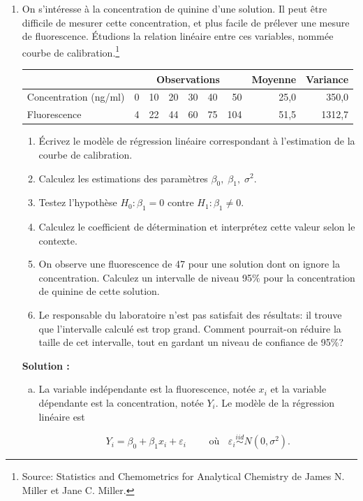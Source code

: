 \documentclass[letter, 11pt]{article}
\newcommand{\prof}[1]{\begin{professeur}\color{blue} {\bf Solution :} #1 \end{professeur}}
\begin{document}
\begin{enumerate}[leftmargin=*, wide, label=\bf Exercice \arabic*:]
\item On s\rq{}intéresse à la concentration de quinine d\rq{}une solution. Il peut être difficile de mesurer cette concentration, et plus facile de prélever une mesure de fluorescence. Étudions la relation linéaire entre ces variables, nommée courbe de calibration.\footnote{Source: Statistics and Chemometrics for Analytical Chemistry  de James N. Miller et Jane C. Miller.}

\begin{table}[h!]
\centering
\begin{tabular}{l|rrrrrr|r|r}
&\multicolumn{6}{|c|}{Observations}&Moyenne&Variance\\\hline
Concentration (ng/ml) & 0 & 10 & 20 & 30 & 40 & 50&25,0&350,0\\\hline
Fluorescence  & 4 & 22 & 44 & 60 & 75 & 104&51,5&1312,7
\end{tabular}
\end{table}

\begin{enumerate}
\item  Écrivez le modèle de régression linéaire correspondant à l\rq{}estimation de la courbe de calibration.
\item  Calculez les estimations des paramètres $\beta_0,\; \beta_1, \; \sigma^2$.
\item  Testez l\rq{}hypothèse $H_0 : \beta_1 =  0$ contre $H_1 : \beta_1 \ne 0$.
\item   Calculez le coefficient de détermination et interprétez cette valeur selon le contexte.
\item   On observe une fluorescence de 47 pour une solution dont on ignore la concentration. Calculez un intervalle de niveau 95$\%$ pour la concentration de quinine de cette solution.
\item   Le responsable du laboratoire n\rq{}est pas satisfait des résultats: il trouve que l\rq{}intervalle calculé est trop grand. Comment pourrait-on réduire la taille de cet intervalle, tout en gardant un niveau de confiance de 95\%?\\
\end{enumerate}

\prof{ \begin{enumerate}[a) ]\itemsep3mm
\item  La variable indépendante est la fluorescence, notée $x_i$ et la variable dépendante est la concentration, notée $Y_i$. Le modèle de la régression linéaire est 

$$ Y_i = \beta_0 + \beta_1 x_i + \varepsilon_i \qquad\mbox{ où } \;\;\varepsilon_i \overset{iid}{\sim}N(0,\sigma^2). $$


\end{enumerate}}
\end{enumerate}
\end{document}
